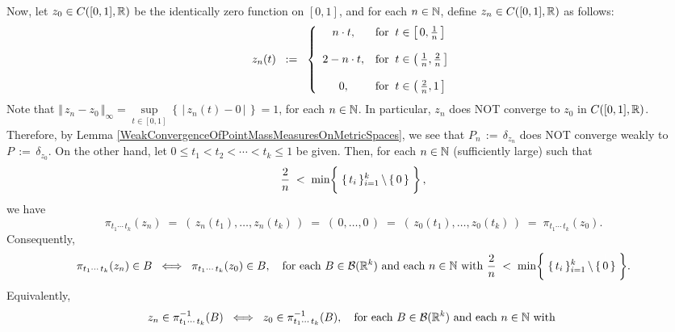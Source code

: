 \begin{enumerate}
	Now, let $z_{0} \in C([0,1],\mathbb{R})$ be the identically zero function on $[0,1]$, and
	for each $n \in \mathbb{N}$, define $z_{n} \in C([0,1],\mathbb{R})$ as follows:
	\begin{equation*}
	z_{n}(t)
	\;\; := \;\;
	\left\{
	\begin{array}{cl}
	n\cdot t, & \textnormal{for}\;\; t \in \left[\,0,\frac{1}{n}\,\right] \\
	\\
	2 - n\cdot t, & \textnormal{for}\;\; t \in \left(\,\frac{1}{n},\frac{2}{n}\,\right] \\
	\\
	0, & \textnormal{for}\;\; t \in \left(\,\frac{2}{n},1\,\right] \\
	\end{array}
	\right.
	\end{equation*}
	Note that $\Vert\,z_{n} - z_{0}\,\Vert_{\infty} = \underset{t\in[0,1]}{\sup}\!\left\{\,\vert\,z_{n}(t) - 0\,\vert\,\right\} = 1$,
	for each $n \in \mathbb{N}$. In particular, $z_{n}$ does NOT converge to $z_{0}$ in $C([0,1],\mathbb{R})$.
	Therefore, by Lemma \ref{WeakConvergenceOfPointMassMeasuresOnMetricSpaces}, we see that
	$P_{n} \,:=\, \delta_{z_{n}}$ does NOT converge weakly to $P \,:=\, \delta_{z_{0}}$.
	On the other hand, let $0 \leq t_{1} < t_{2} < \cdots < t_{k} \leq 1$ be given.
	Then, for each $n \in \mathbb{N}$ (sufficiently large) such that
	\begin{equation*}
	\dfrac{2}{n} \;<\; \min\!\left\{\;\{\,t_{i}\,\}_{i=1}^{k}\,\backslash\,\{\,\overset{{\color{white}1}}{0}\,\}\;\right\},
	\end{equation*}
	we have
	\begin{equation*}
	\pi_{t_{1}\cdots\,t_{k}}(z_{n})
	\;=\; \left(\,z_{n}(t_{1}),\ldots,z_{n}(t_{k})\,\right)
	\;=\; \left(\,0,\ldots,0\,\right)
	\;=\; \left(\,z_{0}(t_{1}),\ldots,z_{0}(t_{k})\,\right)
	\;=\; \pi_{t_{1}\cdots\,t_{k}}(z_{0}).
	\end{equation*}
	Consequently,
	\begin{equation*}
	\pi_{t_{1}\cdots\,t_{k}}(z_{n}) \in B
	\;\;\Longleftrightarrow\;\;
	\pi_{t_{1}\cdots\,t_{k}}(z_{0}) \in B,
	\quad\textnormal{for each $B \in \mathcal{B}(\Re^{k})$ and each $n\in\N$ with
	$\dfrac{2}{n} \;<\; \min\!\left\{\;\{\,t_{i}\,\}_{i=1}^{k}\,\backslash\,\{\,\overset{{\color{white}1}}{0}\,\}\;\right\}$}.
	\end{equation*}
	Equivalently,
	\begin{equation*}
	z_{n} \in \pi_{t_{1}\cdots\,t_{k}}^{-1}(B)
	\;\;\Longleftrightarrow\;\;
	z_{0} \in \pi_{t_{1}\cdots\,t_{k}}^{-1}(B),
	\quad\textnormal{for each $B \in \mathcal{B}(\mathbb{R}^{k})$ and each $n \in \mathbb{N}$ with
}
\end{equation*}
\end{enumerate}
